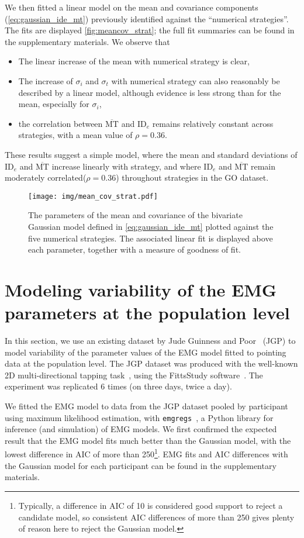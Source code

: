 \documentclass[12pt,a4paper]{article}
\newcommand{\mmt}{\ensuremath{\overline{\text{MT}}}\xspace}
\newcommand{\ide}{\ensuremath{{\text{ID}_e}}\xspace}
\begin{document}
We then fitted a linear model on the mean and covariance components (\autoref{eq:gaussian_ide_mt}) previously identified against the ``numerical strategies''. The fits are displayed \autoref{fig:meancov_strat}; the full fit summaries can be found in the supplementary materials.
We observe that
\begin{itemize}
	\item The linear increase of the mean with numerical strategy is clear,
	\item The increase of $\sigma_i$ and $\sigma_t$ with numerical strategy can also reasonably be described by a linear model, although evidence is less strong than for the mean, especially for $\sigma_i$,
	\item the correlation between \mmt and \ide remains relatively constant across strategies, with a mean value of $\rho = 0.36$.
\end{itemize}

These results suggest a simple model, where the mean and standard deviations of \ide and \mmt increase linearly with strategy, and where \ide and \mmt remain moderately correlated($\rho = 0.36$) throughout strategies in the GO dataset.

\begin{figure}[htbp]
	\centering
	\texttt{[image: img/mean\_cov\_strat.pdf]}
	\caption{The parameters of the mean and covariance of the bivariate Gaussian model defined in \autoref{eq:gaussian_ide_mt} plotted against the five numerical strategies. The associated linear fit is displayed above each parameter, together with a measure of goodness of fit.}
	\label{fig:meancov_strat}
\end{figure}

\section{Modeling variability of the EMG parameters at the population level \label{sec:emg}}
In this section, we use an existing dataset by Jude Guinness and Poor~\cite{jude2016} (JGP) to model variability of the parameter values of the EMG model fitted to pointing data at the population level.
The JGP dataset was produced with the well-known 2D multi-directional tapping task~\cite{soukoreff2004}, using the FittsStudy software~\cite{wobbrock2011}. The experiment was replicated 6 times (on three days, twice a day).


We fitted the EMG model to data from the JGP dataset pooled by participant using maximum likelihood estimation, with \texttt{emgregs}~\cite{emgregs}, a Python library for inference (and simulation) of EMG models.
We first confirmed the expected result that the EMG model fits much better than the Gaussian model, with the lowest difference in AIC of more than 250\footnote{Typically, a difference in AIC of 10 is considered good support to reject a candidate model, so consistent AIC differences of more than 250 gives plenty of reason here to reject the Gaussian model.}. EMG fits and AIC differences with the Gaussian model for each participant can be found in the supplementary materials.
\end{document}
